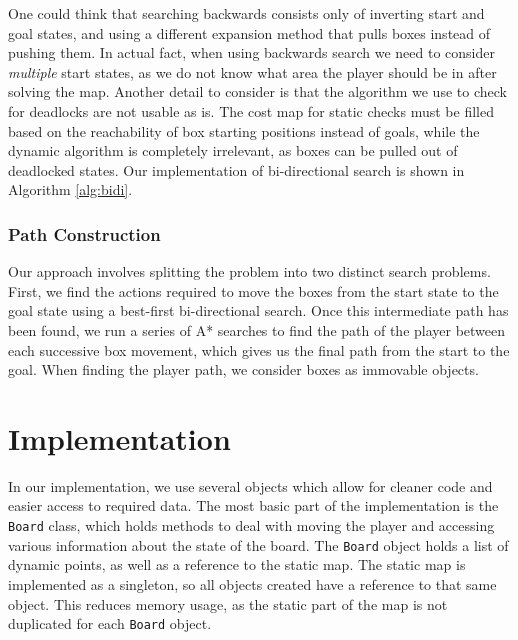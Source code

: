 \documentclass[a4paper,11pt]{article}
\begin{document}
One could think that searching backwards consists only of inverting start and
goal states, and using a different expansion method that pulls boxes instead of
pushing them. In actual fact, when using backwards search we need to consider
\emph{multiple} start states, as we do not know what area the player should be
in after solving the map. Another detail to consider is that the algorithm we
use to check for deadlocks are not usable as is. The cost map for static checks
must be filled based on the reachability of box starting positions instead of
goals, while the dynamic algorithm is completely irrelevant, as boxes can be
pulled out of deadlocked states. Our implementation of bi-directional search is
shown in Algorithm \ref{alg:bidi}.

\subsubsection{Path Construction}
Our approach involves splitting the problem into two distinct search
problems. First, we find the actions required to move the boxes from the start
state to the goal state using a best-first bi-directional search. Once this
intermediate path has been found, we run a series of A* searches to find the
path of the player between each successive box movement, which gives us the
final path from the start to the goal. When finding the player path, we consider
boxes as immovable objects.


\section{Implementation}
In our implementation, we use several objects which allow for cleaner code and
easier access to required data. The most basic part of the implementation is the
\texttt{Board} class, which holds methods to deal with moving the player and
accessing various information about the state of the board. The \texttt{Board}
object holds a list of dynamic points, as well as a reference to the static
map. The static map is implemented as a singleton, so all objects created have a
reference to that same object. This reduces memory usage, as the static part of
the map is not duplicated for each \texttt{Board} object.
\end{document}

